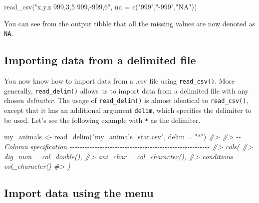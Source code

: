 \documentclass[
]{book}
\newenvironment{Shaded}{\begin{snugshade}}{\end{snugshade}}
\newcommand{\AttributeTok}[1]{\textcolor[rgb]{0.77,0.63,0.00}{#1}}
\newcommand{\CommentTok}[1]{\textcolor[rgb]{0.56,0.35,0.01}{\textit{#1}}}
\newcommand{\FunctionTok}[1]{\textcolor[rgb]{0.00,0.00,0.00}{#1}}
\newcommand{\NormalTok}[1]{#1}
\newcommand{\OtherTok}[1]{\textcolor[rgb]{0.56,0.35,0.01}{#1}}
\newcommand{\StringTok}[1]{\textcolor[rgb]{0.31,0.60,0.02}{#1}}
\begin{document}
\begin{Shaded}
\begin{Highlighting}[]
\FunctionTok{read\_csv}\NormalTok{(}\StringTok{"x,y,z}
\StringTok{          999,3,5}
\StringTok{         999,{-}999,6"}\NormalTok{, }\AttributeTok{na =} \FunctionTok{c}\NormalTok{(}\StringTok{"999"}\NormalTok{,}\StringTok{"{-}999"}\NormalTok{,}\StringTok{"NA"}\NormalTok{))}
\end{Highlighting}
\end{Shaded}

You can see from the output tibble that all the missing values are now denoted as \texttt{NA}.

\hypertarget{importing-data-from-a-delimited-file}{%
\subsection{Importing data from a delimited file}\label{importing-data-from-a-delimited-file}}

You now know how to import data from a .csv file using \texttt{read\_csv()}. More generally, \texttt{read\_delim()} allows us to import data from a delimited file with any chosen \emph{delimiter}. The usage of \texttt{read\_delim()} is almost identical to \texttt{read\_csv()}, except that it has an additional argument \texttt{delim}, which specifies the delimiter to be used. Let's see the following example with \texttt{*} as the delimiter.

\begin{Shaded}
\begin{Highlighting}[]
\NormalTok{my\_animals }\OtherTok{\textless{}{-}} \FunctionTok{read\_delim}\NormalTok{(}\StringTok{"my\_animals\_star.csv"}\NormalTok{, }\AttributeTok{delim =} \StringTok{"*"}\NormalTok{)}
\CommentTok{\#\textgreater{} }
\CommentTok{\#\textgreater{} {-}{-} Column specification {-}{-}{-}{-}{-}{-}{-}{-}{-}{-}{-}{-}{-}{-}{-}{-}{-}{-}{-}{-}{-}{-}{-}{-}{-}{-}{-}{-}{-}{-}{-}{-}{-}{-}{-}{-}{-}{-}{-}{-}{-}{-}{-}{-}{-}{-}{-}{-}{-}{-}{-}{-}{-}{-}{-}{-}}
\CommentTok{\#\textgreater{} cols(}
\CommentTok{\#\textgreater{}   dig\_num = col\_double(),}
\CommentTok{\#\textgreater{}   ani\_char = col\_character(),}
\CommentTok{\#\textgreater{}   conditions = col\_character()}
\CommentTok{\#\textgreater{} )}
\end{Highlighting}
\end{Shaded}

\hypertarget{import-menu}{%
\subsection{Import data using the menu}\label{import-menu}}
\end{document}
